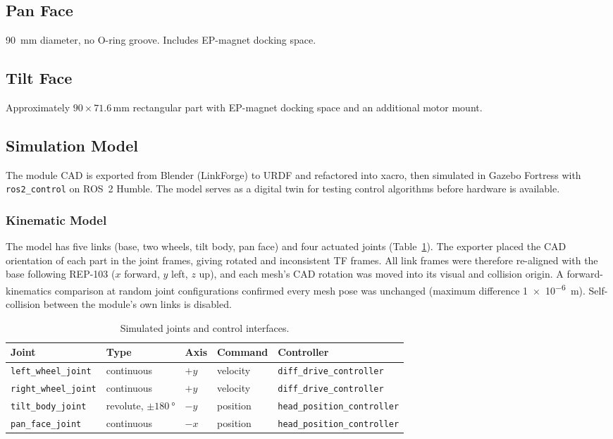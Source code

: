 \documentclass[12pt,a4paper]{article}
\begin{document}
\subsection{Pan Face}

\SI{90}{mm} diameter, no O-ring groove. Includes EP-magnet docking space.

\subsection{Tilt Face}

Approximately $90 \times 71.6$\,mm rectangular part with EP-magnet docking space and an additional motor mount.

\subsection{Simulation Model}
\label{sec:sim-model}

The module CAD is exported from Blender (LinkForge) to URDF and refactored into xacro, then simulated in Gazebo Fortress with \texttt{ros2\_control} on ROS~2 Humble. The model serves as a digital twin for testing control algorithms before hardware is available.

\subsubsection{Kinematic Model}

The model has five links (base, two wheels, tilt body, pan face) and four actuated joints (Table~\ref{tab:sim-joints}). The exporter placed the CAD orientation of each part in the joint frames, giving rotated and inconsistent TF frames. All link frames were therefore re-aligned with the base following REP-103 ($x$ forward, $y$ left, $z$ up), and each mesh's CAD rotation was moved into its visual and collision origin. A forward-kinematics comparison at random joint configurations confirmed every mesh pose was unchanged (maximum difference \SI{1e-6}{m}). Self-collision between the module's own links is disabled.

\begin{table}[H]
	\centering
	\caption{Simulated joints and control interfaces.}
	\label{tab:sim-joints}
	\small
	\begin{tabular}{lllll}
		\toprule
		\textbf{Joint} & \textbf{Type} & \textbf{Axis} & \textbf{Command} & \textbf{Controller} \\
		\midrule
		\texttt{left\_wheel\_joint}  & continuous & $+y$ & velocity & \texttt{diff\_drive\_controller} \\
		\texttt{right\_wheel\_joint} & continuous & $+y$ & velocity & \texttt{diff\_drive\_controller} \\
		\texttt{tilt\_body\_joint}   & revolute, $\pm\SI{180}{\degree}$ & $-y$ & position & \texttt{head\_position\_controller} \\
		\texttt{pan\_face\_joint}    & continuous & $-x$ & position & \texttt{head\_position\_controller} \\
		\bottomrule
	\end{tabular}
\end{table}
\end{document}
